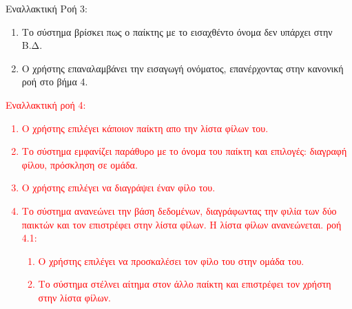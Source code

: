 Εναλλακτική Ροή 3:
\begin{enumerate}[label=5.\alph*.,ref=5.\alph*]
\item Το σύστημα βρίσκει πως ο παίκτης με το εισαχθέντο όνομα δεν υπάρχει στην Β.Δ.
\item Ο χρήστης επαναλαμβάνει την εισαγωγή ονόματος, επανέρχοντας στην κανονική ροή στο βήμα 4.
\end{enumerate}

\textcolor{red}{
Εναλλακτική ροή 4:
\begin{enumerate}
[label=4.\alph*.,ref=4.\alph*]
\item Ο χρήστης επιλέγει κάποιον παίκτη απο την λίστα φίλων του.
\item Το σύστημα εμφανίζει παράθυρο με το όνομα του παίκτη και επιλογές: διαγραφή φίλου, πρόσκληση σε ομάδα.
\item Ο χρήστης επιλέγει να διαγράψει έναν φίλο του.
\item Το σύστημα ανανεώνει την βάση δεδομένων, διαγράφωντας την φιλία των δύο παικτών και τον επιστρέφει στην λίστα φίλων. Η λίστα φίλων ανανεώνεται.
 ροή 4.1:
\begin{enumerate}[label=4.3.\alph*.,ref=4.3.\alph*]
\item Ο χρήστης επιλέγει να προσκαλέσει τον φίλο του στην ομάδα του.
\item Το σύστημα στέλνει αίτημα στον άλλο παίκτη και επιστρέφει τον χρήστη στην λίστα φίλων.
\end{enumerate}
\end{enumerate}
}

